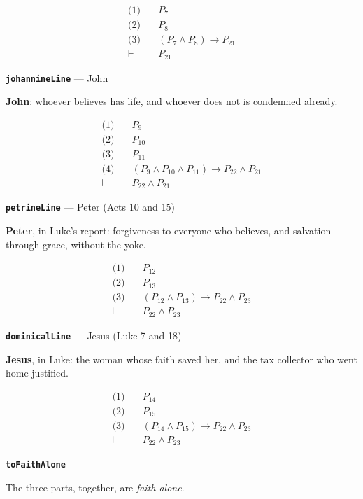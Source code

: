 \documentclass[11pt]{article}
\begin{document}
\begin{align*}
  \text{(1)} \quad & P_{7} \\
  \text{(2)} \quad & P_{8} \\
  \text{(3)} \quad & (P_{7} \land P_{8}) \rightarrow P_{21} \\
  \vdash \quad & P_{21}
\end{align*}
\par\medskip\noindent\textbf{\texttt{johannine\allowbreak{}Line}} --- John\par\nobreak\noindent
\textbf{John}: whoever believes has life, and whoever does not is condemned already.

\begin{align*}
  \text{(1)} \quad & P_{9} \\
  \text{(2)} \quad & P_{10} \\
  \text{(3)} \quad & P_{11} \\
  \text{(4)} \quad & (P_{9} \land P_{10} \land P_{11}) \rightarrow P_{22} \land P_{21} \\
  \vdash \quad & P_{22} \land P_{21}
\end{align*}
\par\medskip\noindent\textbf{\texttt{petrine\allowbreak{}Line}} --- Peter (Acts 10 and 15)\par\nobreak\noindent
\textbf{Peter}, in Luke's report: forgiveness to everyone who believes, and salvation through grace, without the yoke.

\begin{align*}
  \text{(1)} \quad & P_{12} \\
  \text{(2)} \quad & P_{13} \\
  \text{(3)} \quad & (P_{12} \land P_{13}) \rightarrow P_{22} \land P_{23} \\
  \vdash \quad & P_{22} \land P_{23}
\end{align*}
\par\medskip\noindent\textbf{\texttt{dominical\allowbreak{}Line}} --- Jesus (Luke 7 and 18)\par\nobreak\noindent
\textbf{Jesus}, in Luke: the woman whose faith saved her, and the tax collector who went home justified.

\begin{align*}
  \text{(1)} \quad & P_{14} \\
  \text{(2)} \quad & P_{15} \\
  \text{(3)} \quad & (P_{14} \land P_{15}) \rightarrow P_{22} \land P_{23} \\
  \vdash \quad & P_{22} \land P_{23}
\end{align*}
\par\medskip\noindent\textbf{\texttt{to\allowbreak{}Faith\allowbreak{}Alone}}\par\nobreak\noindent
The three parts, together, are \emph{faith alone}.
\end{document}
